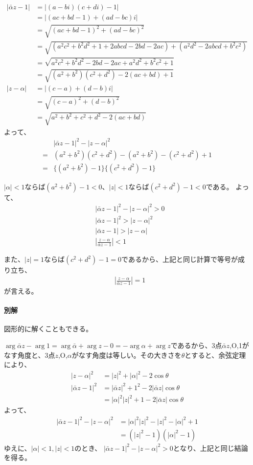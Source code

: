 \begin{align*}
    |\bar{\alpha}z-1|&=|(a-bi)(c+di)-1|\\
    &=|(ac+bd-1)+(ad-bc)i|\\
    &=\sqrt{(ac+bd-1)^2+(ad-bc)^2}\\
    &=\sqrt{(a^2c^2+b^2d^2+1+2abcd-2bd-2ac)+(a^2d^2-2abcd+b^2c^2)}\\
    &=\sqrt{a^2c^2+b^2d^2-2bd-2ac+a^2d^2+b^2c^2+1}\\
    &=\sqrt{(a^2+b^2)(c^2+d^2)-2(ac+bd)+1}\\
    |z-\alpha|&=|(c-a)+(d-b)i|\\
    &=\sqrt{(c-a)^2+(d-b)^2}\\
    &=\sqrt{a^2+b^2+c^2+d^2-2(ac+bd)}
\end{align*}
よって、
\begin{align*}
    &|\bar{\alpha}z-1|^2-|z-\alpha|^2\\
    =&(a^2+b^2)(c^2+d^2)-(a^2+b^2)-(c^2+d^2)+1\\
    =&\{(a^2+b^2)-1\}\{(c^2+d^2)-1\}
\end{align*}

$|\alpha|<1$ならば$(a^2+b^2)-1<0$、$|z|<1$ならば$(c^2+d^2)-1<0$である。
よって、
\begin{align*}
    &|\bar{\alpha}z-1|^2-|z-\alpha|^2>0\\
    &|\bar{\alpha}z-1|^2>|z-\alpha|^2\\
    &|\bar{\alpha}z-1|>|z-\alpha|\\
    &\left|\frac{z-\alpha}{\bar{\alpha}z-1}\right|<1
\end{align*}

また、$|z|=1$ならば$(c^2+d^2)-1=0$であるから、上記と同じ計算で等号が成り立ち、
\begin{align*}
    &\left|\frac{z-\alpha}{\bar{\alpha}z-1}\right|=1
\end{align*}
が言える。

\paragraph{別解}

図形的に解くこともできる。

$\arg\bar{\alpha}z-\arg 1=\arg\bar{\alpha}+\arg z-0=-\arg\alpha+\arg z$であるから、3点$\bar{\alpha}z$,O,1がなす角度と、3点$z$,O,$\alpha$がなす角度は等しい。その大きさを$\theta$とすると、余弦定理により、
\begin{align*}
    |z-\alpha|^2&=|z|^2+|\alpha|^2-2\cos\theta\\
    |\bar{\alpha}z-1|^2&=|\bar{\alpha}z|^2+1^2-2|\bar{\alpha}z|\cos\theta\\
    &=|\alpha|^2|z|^2+1-2|\bar{\alpha}z|\cos\theta
\end{align*}
よって、
\begin{align*}
    |\bar{\alpha}z-1|^2-|z-\alpha|^2&=|\alpha|^2|z|^2-|z|^2-|\alpha|^2+1\\
    &=(|z|^2-1)(|\alpha|^2-1)
\end{align*}
ゆえに、$|\alpha|<1, |z|<1$のとき、 $|\bar{\alpha}z-1|^2-|z-\alpha|^2>0$となり、上記と同じ結論を得る。

